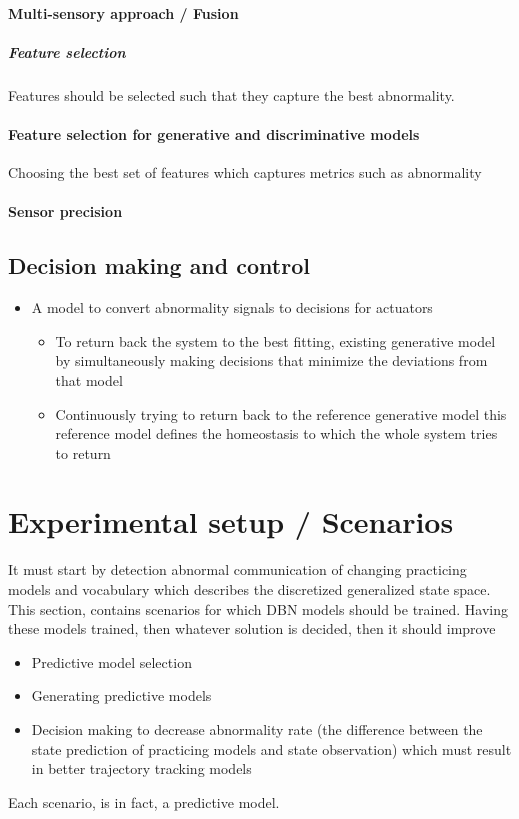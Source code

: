 \documentclass{article}
\begin{document}
			\paragraph{Multi-sensory approach / Fusion}
				\subparagraph{Feature selection} Features should be selected such that they capture the best abnormality. 
			
			\paragraph{Feature selection for generative and discriminative models}
			Choosing the best set of features which captures metrics such as abnormality
			
			\paragraph{Sensor precision} 
			
		\subsection{Decision making and control}
			\begin{itemize}
				\item A model to convert abnormality signals to decisions for actuators
				\begin{itemize}
					\item To return back the system to the best fitting, existing generative model by simultaneously making decisions that minimize the deviations from that model
					\item Continuously trying to return back to the reference generative model this reference model defines the homeostasis to which the whole system tries to return 
				\end{itemize}
			\end{itemize}
		
		
	\section{Experimental setup / Scenarios} \label{sec:scenarios}
		It must start by detection abnormal communication of changing practicing models and vocabulary which describes the discretized generalized state space. This section, contains scenarios for which DBN models should be trained. Having these models trained, then whatever solution is decided, then it should improve 
		\begin{itemize}
			\item Predictive model selection
			\item Generating predictive models
			\item Decision making to decrease abnormality rate (the difference between the state prediction of practicing models and state observation) which must result in better trajectory tracking models
		\end{itemize}
		Each scenario, is in fact, a predictive model.
\end{document}
